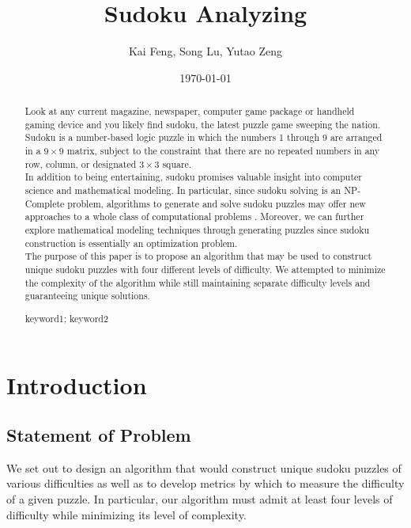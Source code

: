 \documentclass{mcmthesis}
\title{Sudoku Analyzing}
\author{Kai Feng, Song Lu, Yutao Zeng }
\date{\today}
\begin{document}
\begin{abstract}
\indent \indent Look at any current magazine, newspaper, computer game package or handheld gaming device and you likely find sudoku, the latest puzzle game sweeping the nation. Sudoku is a number-based logic puzzle in which the numbers 1 through 9 are arranged in a $9 \times 9$ matrix, subject to the constraint that there are no repeated numbers in any row, column, or designated $3 \times 3$ square.\\
\indent In addition to being entertaining, sudoku promises valuable insight into computer science and mathematical modeling. In particular, since sudoku solving is an NP-Complete problem, algorithms to generate and solve sudoku puzzles may offer new approaches to a whole class of computational problems . Moreover, we can further explore mathematical modeling techniques through generating puzzles since sudoku construction is essentially an optimization problem.\\
\indent The purpose of this paper is to propose an algorithm that may be used to construct unique sudoku puzzles with four different levels of difficulty. We attempted to minimize the complexity of the algorithm while still maintaining separate difficulty levels and guaranteeing unique solutions.\\
\begin{keywords}
keyword1; keyword2
\end{keywords}
\end{abstract}
\maketitle

\begin{spacing}{1.0}
\tableofcontents
\end{spacing}
\newpage

\section{Introduction}
\subsection{Statement of Problem}
We set out to design an algorithm that would construct unique sudoku puzzles of various difficulties as well as to develop metrics by which to measure the difficulty of a given puzzle. In particular, our algorithm must admit at least four levels of difficulty while minimizing its level of complexity.
\end{document}
